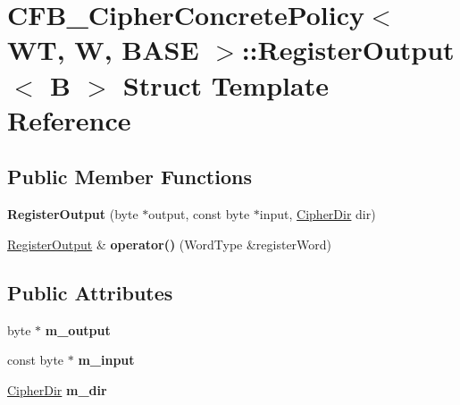 \hypertarget{struct_c_f_b___cipher_concrete_policy_1_1_register_output}{
\section{CFB\_\-CipherConcretePolicy$<$ WT, W, BASE $>$::RegisterOutput$<$ B $>$ Struct Template Reference}
\label{struct_c_f_b___cipher_concrete_policy_1_1_register_output}
}
\subsection*{Public Member Functions}
\begin{DoxyCompactItemize}
\item 
\hypertarget{struct_c_f_b___cipher_concrete_policy_1_1_register_output_a220fb3f949134ff82c40d18115a495ef}{
{\bfseries RegisterOutput} (byte $\ast$output, const byte $\ast$input, \hyperlink{cryptlib_8h_a353ccabf5ddc119a6a33e92f7b9961c7}{CipherDir} dir)}
\label{struct_c_f_b___cipher_concrete_policy_1_1_register_output_a220fb3f949134ff82c40d18115a495ef}

\item 
\hypertarget{struct_c_f_b___cipher_concrete_policy_1_1_register_output_a82f4011e9652312a0216345186fa3ada}{
\hyperlink{struct_c_f_b___cipher_concrete_policy_1_1_register_output}{RegisterOutput} \& {\bfseries operator()} (WordType \&registerWord)}
\label{struct_c_f_b___cipher_concrete_policy_1_1_register_output_a82f4011e9652312a0216345186fa3ada}

\end{DoxyCompactItemize}
\subsection*{Public Attributes}
\begin{DoxyCompactItemize}
\item 
\hypertarget{struct_c_f_b___cipher_concrete_policy_1_1_register_output_a9e0b19b991f7ea809fdacf4160301ad6}{
byte $\ast$ {\bfseries m\_\-output}}
\label{struct_c_f_b___cipher_concrete_policy_1_1_register_output_a9e0b19b991f7ea809fdacf4160301ad6}

\item 
\hypertarget{struct_c_f_b___cipher_concrete_policy_1_1_register_output_adee6a78dc75f70c6b3f485720a2e9448}{
const byte $\ast$ {\bfseries m\_\-input}}
\label{struct_c_f_b___cipher_concrete_policy_1_1_register_output_adee6a78dc75f70c6b3f485720a2e9448}

\item 
\hypertarget{struct_c_f_b___cipher_concrete_policy_1_1_register_output_a818280855d8986219a63d7890626c220}{
\hyperlink{cryptlib_8h_a353ccabf5ddc119a6a33e92f7b9961c7}{CipherDir} {\bfseries m\_\-dir}}
\label{struct_c_f_b___cipher_concrete_policy_1_1_register_output_a818280855d8986219a63d7890626c220}

\end{DoxyCompactItemize}
